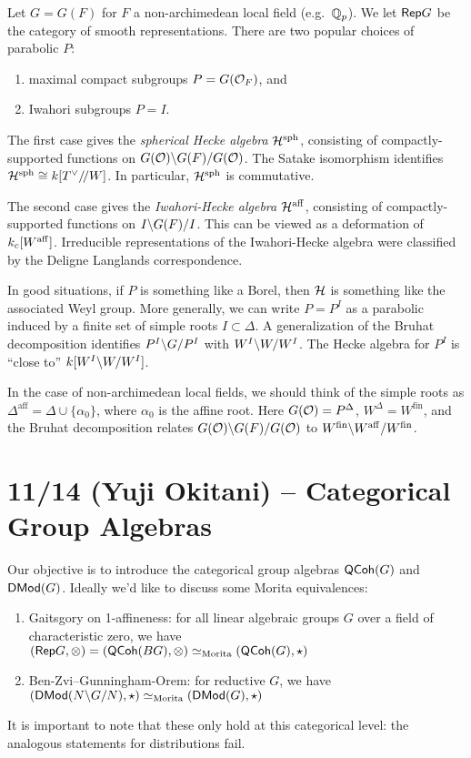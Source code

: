 \documentclass{article}
\begin{document}
\begin{ex}
	Let $G = G(F)$ for $F$ a non-archimedean local field (e.g.\ $\mathbb{Q}_p$).
	We let $\mathsf{Rep} G$ be the category of smooth representations.
	There are two popular choices of parabolic $P$:
	\begin{enumerate}
		\item maximal compact subgroups $P = G(\mathcal{O}_F)$, and 
		\item Iwahori subgroups $P = I$.
	\end{enumerate}
	
	The first case gives the \emph{spherical Hecke algebra} $\mathcal{H}^{\mathrm{sph}}$, consisting of compactly-supported functions on $G(\mathcal{O}) \backslash G(F) / G(\mathcal{O})$.
	The Satake isomorphism identifies $\mathcal{H}^{\mathrm{sph}} \cong k[T^\vee /\mkern-3mu/ W]$.
	In particular, $\mathcal{H}^{\mathrm{sph}}$ is commutative.

	The second case gives the \emph{Iwahori-Hecke algebra} $\mathcal{H}^{\mathrm{aff}}$, consisting of compactly-supported functions on $I \backslash G(F) / I$.
	This can be viewed as a deformation of $k_c[W^{\mathrm{aff}}]$.
	Irreducible representations of the Iwahori-Hecke algebra were classified by the Deligne Langlands correspondence.
\end{ex}

In good situations, if $P$ is something like a Borel, then $\mathcal{H}$ is something like the associated Weyl group.
More generally, we can write $P = P^I$ as a parabolic induced by a finite set of simple roots $I \subset \Delta$.
A generalization of the Bruhat decomposition identifies $P^I \backslash G / P^I$ with $W^I \backslash W / W^I$.
The Hecke algebra for $P^I$ is ``close to'' $k[W^I \backslash W / W^I]$.

\begin{ex}
	In the case of non-archimedean local fields, we should think of the simple roots as $\Delta^{\textrm{aff}} = \Delta \cup \{ \alpha_0 \}$, where $\alpha_0$ is the affine root.
	Here $G(\mathcal{O}) = P^\Delta$, $W^\Delta = W^{\mathrm{fin}}$, and the Bruhat decomposition relates $G(\mathcal{O}) \backslash G(F) / G(\mathcal{O})$ to $W^{\mathrm{fin}} \backslash W^{\mathrm{aff}} / W^{\mathrm{fin}}$.
\end{ex}

\section{11/14 (Yuji Okitani) -- Categorical Group Algebras}

Our objective is to introduce the categorical group algebras $\mathsf{QCoh}(G)$ and $\mathsf{DMod}(G)$.
Ideally we'd like to discuss some Morita equivalences:
\begin{enumerate}
	\item Gaitsgory on 1-affineness: for all linear algebraic groups $G$ over a field of characteristic zero, we have $(\mathsf{Rep} G, \otimes) = (\mathsf{QCoh}(BG), \otimes) \simeq_\textrm{Morita} (\mathsf{QCoh}(G), \star)$ 
	\item Ben-Zvi--Gunningham-Orem: for reductive $G$, we have $(\mathsf{DMod}(N \backslash G / N), \star) \simeq_\textrm{Morita} (\mathsf{DMod}(G), \star)$
\end{enumerate}
It is important to note that these only hold at this categorical level: the analogous statements for distributions fail.
\end{document}
